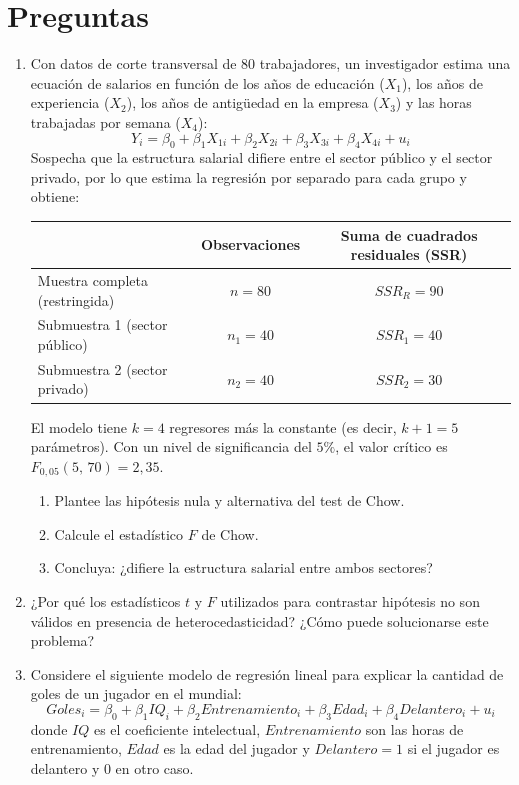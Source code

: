 \documentclass[letterpaper,11pt]{article}
\begin{document}
\section{Preguntas}
\begin{enumerate}
\item  Con datos de corte transversal de 80 trabajadores, un investigador estima una ecuación de salarios en función de los años de educación ($X_1$), los años de experiencia ($X_2$), los años de antigüedad en la empresa ($X_3$) y las horas trabajadas por semana ($X_4$):
\[
Y_i = \beta_0 + \beta_1 X_{1i} + \beta_2 X_{2i} + \beta_3 X_{3i} + \beta_4 X_{4i} + u_i
\]
Sospecha que la estructura salarial difiere entre el sector público y el sector privado, por lo que estima la regresión por separado para cada grupo y obtiene:

\begin{center}
\begin{tabular}{lcc}
\hline
 & Observaciones & Suma de cuadrados residuales (SSR) \\
\hline
Muestra completa (restringida) & $n = 80$ & $SSR_R = 90$ \\
Submuestra 1 (sector público)  & $n_1 = 40$ & $SSR_1 = 40$ \\
Submuestra 2 (sector privado)  & $n_2 = 40$ & $SSR_2 = 30$ \\
\hline
\end{tabular}
\end{center}

El modelo tiene $k=4$ regresores más la constante (es decir, $k+1=5$ parámetros). Con un nivel de significancia del $5\%$, el valor crítico es $F_{0,05}(5,\,70) = 2{,}35$.

\begin{enumerate}[label=\alph*)]
    \item  Plantee las hipótesis nula y alternativa del test de Chow.
    \item  Calcule el estadístico $F$ de Chow.
    \item  Concluya: ¿difiere la estructura salarial entre ambos sectores?
\end{enumerate}

    \item  ¿Por qué los estadísticos \(t\) y \(F\) utilizados para contrastar hipótesis no son válidos en presencia de heterocedasticidad? ¿Cómo puede solucionarse este problema?

    \item  Considere el siguiente modelo de regresión lineal para explicar la cantidad de goles de un jugador en el mundial:
\[
Goles_i = \beta_0 + \beta_1 IQ_i + \beta_2 Entrenamiento_i + \beta_3 Edad_i + \beta_4 Delantero_i + u_i
\]
donde $IQ$ es el coeficiente intelectual, $Entrenamiento$ son las horas de entrenamiento, $Edad$ es la edad del jugador y $Delantero = 1$ si el jugador es delantero y $0$ en otro caso.


\end{enumerate}
\end{document}
